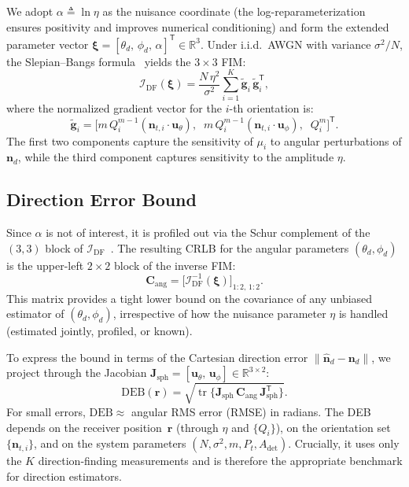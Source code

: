 \documentclass[journal]{IEEEtran}
\begin{document}
We adopt $\alpha\triangleq\ln\eta$ as the nuisance coordinate (the log-reparameterization ensures positivity and improves numerical conditioning) and form the extended parameter vector $\boldsymbol{\xi}=[\theta_d,\,\phi_d,\,\alpha]^{\mathsf T}\in\mathbb{R}^3$. Under i.i.d.\ AWGN with variance $\sigma^2/N$, the Slepian--Bangs formula~\cite{Kay1993} yields the $3\times3$ FIM:
\begin{equation}
\mathcal{I}_{\mathrm{DF}}(\boldsymbol\xi)
= \frac{N\,\eta^2}{\sigma^2}
  \sum_{i=1}^{K}
  \tilde{\mathbf g}_i\,\tilde{\mathbf g}_i^{\mathsf T},
\label{eq:FIM_DEB}
\end{equation}
where the normalized gradient vector for the $i$-th orientation is:
\begin{equation}
\tilde{\mathbf g}_i = \bigl[m\,Q_i^{m-1}(\mathbf{n}_{t,i}\!\cdot\!\mathbf{u}_\theta),\;\;m\,Q_i^{m-1}(\mathbf{n}_{t,i}\!\cdot\!\mathbf{u}_\phi),\;\;Q_i^m\bigr]^{\mathsf T}.
\label{eq:grad_xi}
\end{equation}
The first two components capture the sensitivity of $\mu_i$ to angular perturbations of $\mathbf{n}_d$, while the third component captures sensitivity to the amplitude $\eta$.

\subsection{Direction Error Bound}
\label{subsec:DEB}
Since $\alpha$ is not of interest, it is profiled out via the Schur complement of the $(3,3)$ block of $\mathcal{I}_{\mathrm{DF}}$~\cite{Kay1993}. The resulting CRLB for the angular parameters $(\theta_d,\phi_d)$ is the upper-left $2\times2$ block of the inverse FIM:
\begin{equation}
\mathbf{C}_{\mathrm{ang}} = \bigl[\mathcal{I}_{\mathrm{DF}}^{-1}(\boldsymbol\xi)\bigr]_{1:2,\,1:2}.
\label{eq:C_ang}
\end{equation}
This matrix provides a tight lower bound on the covariance of any unbiased estimator of $(\theta_d,\phi_d)$, irrespective of how the nuisance parameter $\eta$ is handled (estimated jointly, profiled, or known).

To express the bound in terms of the Cartesian direction error $\lVert\hat{\mathbf{n}}_d - \mathbf{n}_d\rVert$, we project through the Jacobian $\mathbf{J}_{\mathrm{sph}}=[\mathbf{u}_\theta,\,\mathbf{u}_\phi]\in\mathbb{R}^{3\times2}$:
\begin{equation}
\mathrm{DEB}(\mathbf{r})
= \sqrt{\operatorname{tr}\!\bigl\{\mathbf{J}_{\mathrm{sph}}\,\mathbf{C}_{\mathrm{ang}}\,\mathbf{J}_{\mathrm{sph}}^{\mathsf T}\bigr\}}.
\label{eq:DEB}
\end{equation}
For small errors, $\mathrm{DEB}\approx$ angular RMS error (RMSE) in radians. The DEB depends on the receiver position~$\mathbf{r}$ (through $\eta$ and $\{Q_i\}$), on the orientation set $\{\mathbf{n}_{t,i}\}$, and on the system parameters $(N,\sigma^2,m,P_t,A_{\mathrm{det}})$. Crucially, it uses only the $K$ direction-finding measurements and is therefore the appropriate benchmark for direction estimators.
\end{document}
